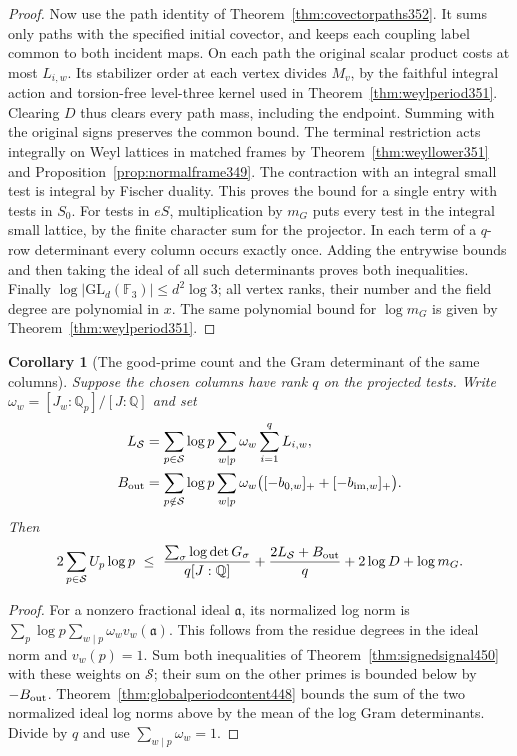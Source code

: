 \documentclass[a4paper,11pt]{article}
\newtheorem{corollary}[proposition]{Corollary}
\theoremstyle{definition}
\theoremstyle{remark}
\numberwithin{equation}{section}
\begin{document}
\begin{proof}
Now use the path identity of Theorem~\ref{thm:covectorpaths352}.
It sums only paths with the specified initial covector, and keeps
each coupling label common to both incident maps. On each path
the original scalar product costs at most \(L_{i,w}\).
Its stabilizer order at each vertex divides \(M_v\), by the
faithful integral action and torsion-free level-three kernel
used in Theorem~\ref{thm:weylperiod351}. Clearing \(D\) thus
clears every path mass, including the endpoint. Summing with
the original signs preserves the common bound. The terminal
restriction acts integrally on Weyl lattices in matched frames
by Theorem~\ref{thm:weyllower351} and
Proposition~\ref{prop:normalframe349}. The contraction with an
integral small test is integral by Fischer duality.
This proves the bound for a single entry with tests in \(S_0\).
For tests in \(eS\), multiplication by \(m_G\) puts every test
in the integral small lattice, by the finite character sum for
the projector. In each term of a \(q\)-row determinant every
column occurs exactly once. Adding the entrywise bounds and
then taking the ideal of all such determinants proves both
inequalities. Finally \(\log|\mathrm{GL}_d(\mathbb F_3)|
\le d^2\log3\); all vertex ranks, their number and the field
degree are polynomial in \(x\). The same polynomial bound for
\(\log m_G\) is given by Theorem~\ref{thm:weylperiod351}.
\end{proof}

\begin{corollary}[The good-prime count and the Gram determinant of the same columns]\leavevmode
\label{cor:gramsignal450}
Suppose the chosen columns have rank \(q\) on the projected
tests. Write \(\omega_w=[J_w:\mathbb Q_p]/[J:\mathbb Q]\) and set
\[
 \begin{split}
 L_{\mathcal S}&=\sum_{p\in\mathcal S}\log p
                  \sum_{w\mid p}\omega_w\sum_{i=1}^q L_{i,w},\\
 B_{\rm out}&=\sum_{p\notin\mathcal S}\log p
     \sum_{w\mid p}\omega_w
           \big([-b_{0,w}]_++[-b_{{\rm im},w}]_+\big).
 \end{split}
\]
Then
\[
 2\sum_{p\in\mathcal S}U_p\log p
 \ \le\ \frac{\sum_\sigma\log\det G_\sigma}{q[J:\mathbb Q]}
      +\frac{2L_{\mathcal S}+B_{\rm out}}q+2\log D+\log m_G .
\]
\end{corollary}
\begin{proof}
For a nonzero fractional ideal \(\mathfrak a\), its normalized
log norm is \(\sum_p\log p\sum_{w\mid p}\omega_w v_w(\mathfrak a)\).
This follows from the residue degrees in the ideal norm and
\(v_w(p)=1\). Sum both inequalities of
Theorem~\ref{thm:signedsignal450} with these weights on
\(\mathcal S\); their sum on the other primes is bounded below
by \(-B_{\rm out}\). Theorem~\ref{thm:globalperiodcontent448}
bounds the sum of the two normalized ideal log norms above by
the mean of the log Gram determinants. Divide by \(q\) and
use \(\sum_{w\mid p}\omega_w=1\).
\end{proof}
\end{document}
